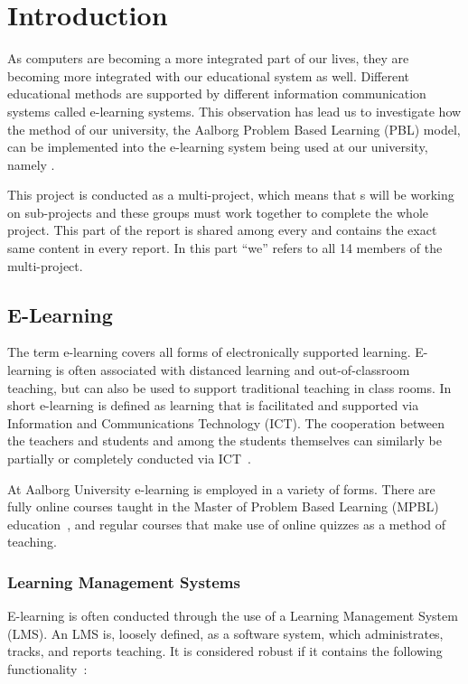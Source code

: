 \chapter{Introduction}
As computers are becoming a more integrated part of our lives, they are becoming more integrated with our educational system as well.
Different educational methods are supported by different information communication systems called e-learning systems.
This observation has lead us to investigate how the method of our university, the Aalborg Problem Based Learning (PBL) model, can be implemented into the e-learning system being used at our university, namely \moodle{}.

This project is conducted as a multi-project, which means that \subgroup{}s will be working on sub-projects and these groups must work together to complete the whole project.
This part of the report is shared among every \subgroup{} and contains the exact same content in every report.
In this part ``we'' refers to all 14 members of the multi-project.

\section{E-Learning}
\label{sec:e-learning}
The term e-learning covers all forms of electronically supported learning. 
E-learning is often associated with distanced learning and out-of-classroom teaching, but can also be used to support traditional teaching in class rooms. 
In short e-learning is defined as learning that is facilitated and supported via Information and Communications Technology (ICT). 
The cooperation between the teachers and students and among the students themselves can similarly be partially or completely conducted via ICT~\cite{def-e-learning1}\cite{def-e-learning2}.

At Aalborg University e-learning is employed in a variety of forms. 
There are fully online courses taught in the Master of Problem Based Learning (MPBL) education~\cite{mpbl}, and regular courses that make use of online quizzes as a method of teaching.

\subsection{Learning Management Systems}
\label{sub:lms}
E-learning is often conducted through the use of a Learning Management System (LMS). 
An LMS is, loosely defined, as a software system, which administrates, tracks, and reports teaching. 
It is considered robust if it contains the following functionality~\citep{Ellis09}:

